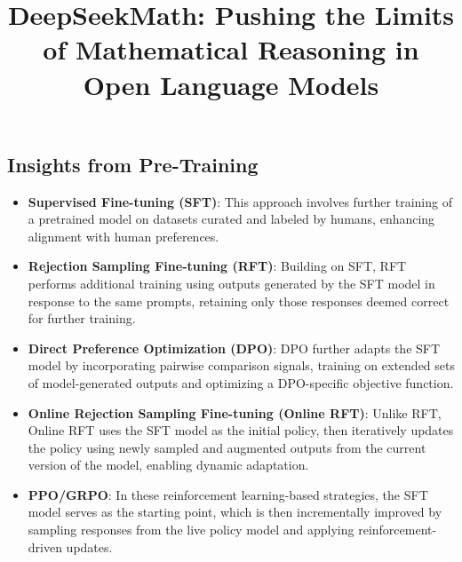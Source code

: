 \title{DeepSeekMath: Pushing the Limits of Mathematical Reasoning in Open Language Models}
\subsection{Insights from Pre-Training}

\begin{itemize}
    \item \textbf{Supervised Fine-tuning (SFT)}: This approach involves further training of a pretrained model on datasets curated and labeled by humans, enhancing alignment with human preferences.
    \item \textbf{Rejection Sampling Fine-tuning (RFT)}: Building on SFT, RFT performs additional training using outputs generated by the SFT model in response to the same prompts, retaining only those responses deemed correct for further training.
    \item \textbf{Direct Preference Optimization (DPO)}: DPO further adapts the SFT model by incorporating pairwise comparison signals, training on extended sets of model-generated outputs and optimizing a DPO-specific objective function.
    \item \textbf{Online Rejection Sampling Fine-tuning (Online RFT)}: Unlike RFT, Online RFT uses the SFT model as the initial policy, then iteratively updates the policy using newly sampled and augmented outputs from the current version of the model, enabling dynamic adaptation.
    \item \textbf{PPO/GRPO}: In these reinforcement learning-based strategies, the SFT model serves as the starting point, which is then incrementally improved by sampling responses from the live policy model and applying reinforcement-driven updates.
\end{itemize}

